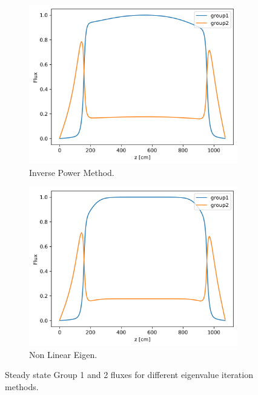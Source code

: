 \documentclass[11pt,letterpaper]{article}
\begin{document}
	\begin{figure}[htbp!]
		\centering
		\begin{subfigure}[t]{0.4\textwidth}
			\centering
			\includegraphics[width=\linewidth]{1D-fuel-reflec-eig1B}
			\caption{Inverse Power Method.}
		\end{subfigure}
		\begin{subfigure}[t]{0.4\textwidth}
			\centering
			\includegraphics[width=\linewidth]{1D-fuel-reflec-eig2B}
			\caption{Non Linear Eigen.}
		\end{subfigure}
		\hfill
		\caption{Steady state Group 1 and 2 fluxes for different eigenvalue iteration methods.}
		\label{fig:1D-fuel-reflec-eig}
	\end{figure}

\pagebreak

% 
\end{document}
